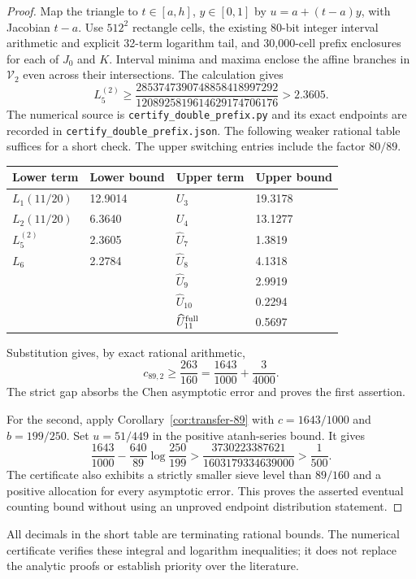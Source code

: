 \documentclass[11pt]{article}
\begin{document}
\begin{proof}
Map the triangle to $t\in[a,h]$, $y\in[0,1]$ by
$u=a+(t-a)y$, with Jacobian $t-a$.
Use $512^2$ rectangle cells, the existing 80-bit integer interval
arithmetic and explicit 32-term logarithm tail, and 30,000-cell
prefix enclosures for each of $J_0$ and $K$.
Interval minima and maxima enclose the affine branches in
$\mathcal V_2$ even across their intersections.
The calculation gives
\[
 L_5^{(2)}\ge
 \frac{2853747390748858418997292}{1208925819614629174706176}
 >2.3605.
\]
The numerical source is \texttt{certify\_double\_prefix.py} and
its exact endpoints are recorded in
\texttt{certify\_double\_prefix.json}.
The following weaker rational table suffices for a short check.
The upper switching entries include the factor $80/89$.
\begin{center}
\begin{tabular}{ll@{\qquad}ll}
\toprule
Lower term&Lower bound&Upper term&Upper bound\\
\midrule
$L_1(11/20)$&12.9014&$U_3$&19.3178\\
$L_2(11/20)$&6.3640&$U_4$&13.1277\\
$L_5^{(2)}$&2.3605&$\widehat U_7$&1.3819\\
$L_6$&2.2784&$\widehat U_8$&4.1318\\
&&$\widehat U_9$&2.9919\\
&&$\widehat U_{10}$&0.2294\\
&&$\widehat U_{11}^{\rm full}$&0.5697\\
\bottomrule
\end{tabular}
\end{center}
Substitution gives, by exact rational arithmetic,
\[
 c_{89,2}\ge\frac{263}{160}
       =\frac{1643}{1000}+\frac3{4000}.
\]
The strict gap absorbs the Chen asymptotic error and proves the
first assertion.

For the second, apply Corollary~\ref{cor:transfer-89} with
$c=1643/1000$ and $b=199/250$.
Set $u=51/449$ in the positive atanh-series bound. It gives
\[
 \frac{1643}{1000}-\frac{640}{89}\log\frac{250}{199}
 >\frac{3730223387621}{1603179334639000}>\frac1{500}.
\]
The certificate also exhibits a strictly smaller sieve level than
$89/160$ and a positive allocation for every asymptotic error.
This proves the asserted eventual counting bound without using an
unproved endpoint distribution statement.
\end{proof}

All decimals in the short table are terminating rational bounds.
The numerical certificate verifies these integral and logarithm
inequalities; it does not replace the analytic proofs or establish
priority over the literature.
\end{document}
